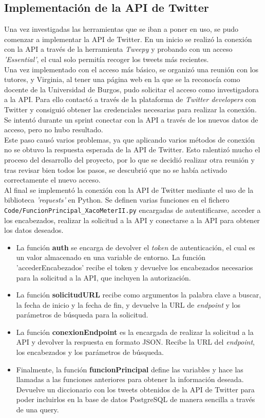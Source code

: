 \subsection{Implementación de la API de Twitter}
Una vez investigadas las herramientas que se iban a  poner en uso, se pudo comenzar a implementar la API de Twitter. En un inicio se realizó la conexión con la API a través de la herramienta \textit{Tweepy} y probando con un acceso \textit{'Essential'}, el cual solo permitía recoger los tweets más recientes.\\
Una vez implementado con el acceso más básico, se organizó una reunión con los tutores, y Virginia, al tener una página web en la que se la reconocía como docente de la Universidad de Burgos, pudo solicitar el acceso como investigadora a la API. Para ello contactó a través de la plataforma de \textit{Twitter developers} con Twitter y consiguió obtener las credenciales necesarias para realizar la conexión.\\
Se intentó durante un sprint conectar con la API a través de los nuevos datos de acceso, pero no hubo resultado.\\
Este paso causó varios problemas, ya que aplicando varios métodos de conexión no se obtuvo la respuesta esperada de la API de Twitter. Esto ralentizó mucho el proceso del desarrollo del proyecto, por lo que se decidió realizar otra reunión y tras revisar bien todos los pasos, se descubrió que no se había activado correctamente el nuevo acceso. \\
Al final se implementó la conexión con la API de Twitter mediante el uso de la biblioteca \textit{'requests'} en Python. Se definen varias funciones en el fichero \texttt{Code/FuncionPrincipal\_XacoMeterII.py} encargadas de autentificarse, acceder a los encabezados, realizar la solicitud a la API y conectarse a la API para obtener los datos deseados.\\
\begin{itemize}
    \item La función \textbf{auth} se encarga de devolver el \textit{token} de autenticación, el cual es un valor almacenado en una variable de entorno. La función 'accederEncabezados' recibe el token y devuelve los encabezados necesarios para la solicitud a la API, que incluyen la autorización.
    \item La función \textbf{solicitudURL} recibe como argumentos la palabra clave a buscar, la fecha de inicio y la fecha de fin, y devuelve la URL de \textit{endpoint} y los parámetros de búsqueda para la solicitud.
    \item La función \textbf{conexionEndpoint} es la encargada de realizar la solicitud a la API y devolver la respuesta en formato JSON. Recibe la URL del \textit{endpoint}, los encabezados y los parámetros de búsqueda.
    \item Finalmente, la función \textbf{funcionPrincipal} define las variables y hace las llamadas a las funciones anteriores para obtener la información deseada. Devuelve un diccionario con los tweets obtenidos de la API de Twitter para poder incluirlos en la base de datos PostgreSQL de manera sencilla a través de una query.
\end{itemize}

